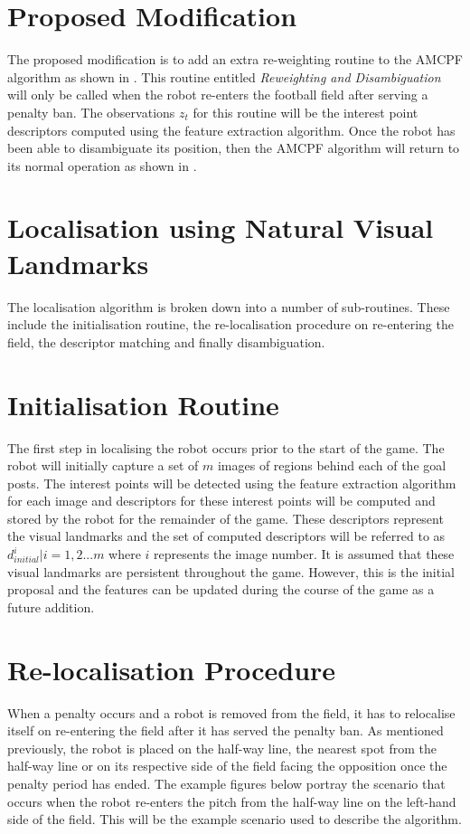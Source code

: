 \documentclass[11pt]{report}
\begin{document}
\section{Proposed Modification}
\label{sec:modification}
The proposed modification is to add an extra re-weighting routine to the AMCPF algorithm as shown in . This routine entitled \textit{Reweighting and Disambiguation} will only be called when the robot re-enters the football field after serving a penalty ban. The observations $z_t$ for this routine will be the interest point descriptors computed using the feature extraction algorithm. Once the robot has been able to disambiguate its position, then the AMCPF algorithm will return to its normal operation as shown in .\\

\section{Localisation using Natural Visual Landmarks}
\label{sec:localisationNaturalVisualLandmarks}
The localisation algorithm is broken down into a number of sub-routines. These include the initialisation routine, the re-localisation procedure on re-entering the field, the descriptor matching and finally disambiguation.\\

\section{Initialisation Routine}
\label{sec:initialisation}
The first step in localising the robot occurs prior to the start of the game. The robot will initially capture a set of $m$ images of regions behind each of the goal posts. The interest points will be detected using the feature extraction algorithm for each image and descriptors for these interest points will be computed and stored by the robot for the remainder of the game. These descriptors represent the visual landmarks and the set of computed descriptors will be referred to as $d_{initial}^i |i = 1,2...m$ where $i$ represents the image number. It is assumed that these visual landmarks are persistent throughout the game. However, this is the initial proposal and the features can be updated during the course of the game as a future addition.\\

\section{Re-localisation Procedure}
\label{sec:relocalisation}
When a penalty occurs and a robot is removed from the field, it has to relocalise itself on re-entering the field after it has served the penalty ban. As mentioned previously, the robot is placed on the half-way line, the nearest spot from the half-way line or on its respective side of the field facing the opposition once the penalty period has ended. The example figures below portray the scenario that occurs when the robot re-enters the pitch from the half-way line on the left-hand side of the field. This will be the example scenario used to describe the algorithm.\\
\end{document}
